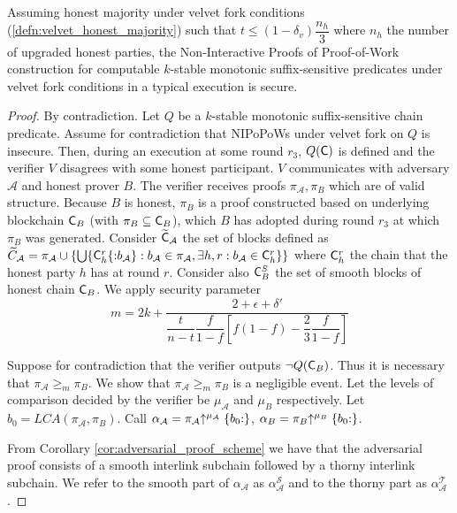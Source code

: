 \begin{theorem}
	Assuming honest majority under velvet fork conditions (\ref{defn:velvet_honest_majority}) such that $t \leq (1 - \delta_v) \dfrac{n_h}{3}$ where $n_h$ the number of upgraded honest parties, the Non-Interactive Proofs of Proof-of-Work construction for computable $k$-stable monotonic suffix-sensitive predicates under velvet fork conditions in a typical execution is secure.
\end{theorem}
\begin{proof}
By contradiction. Let $Q$ be a $k$-stable monotonic suffix-sensitive chain predicate. Assume for contradiction that NIPoPoWs under velvet fork on $Q$ is insecure. Then, during an execution at some round  $r_3$, $Q(\mathsf{C})$ is defined and the verifier $V$ disagrees with some honest participant. $V$ communicates with adversary $\mathcal{A}$ and honest prover $B$. The verifier receives proofs $\pi_\mathcal{A}, \pi_B$ which are of valid structure. Because $B$ is honest, $\pi_B$ is a proof constructed based on underlying blockchain $\mathsf{C}_B$ (with $\pi_B \subseteq \mathsf{C}_B$), which $B$ has adopted during round $r_3$ at which $\pi_B$ was generated. Consider $\widetilde{\mathsf{C}}_\mathcal{A}$ the set of blocks defined as $\widetilde{C}_\mathcal{A} = \pi_\mathcal{A} \cup \{ \bigcup \{\mathsf{C}_h^r\{{:}b_\mathcal{A}\}:  b_\mathcal{A} \in \pi_\mathcal{A}, \exists h,r : b_\mathcal{A} \in \mathsf{C}_{h}^{r}\}  \}$ where $\mathsf{C}_h^r$ the chain that the honest party $h$ has at round $r$. Consider also $\mathsf{C}^S_B$ the set of smooth blocks of honest chain $\mathsf{C}_B$. We apply security parameter
\begin{equation*}
    m = 2k + \dfrac{2+\epsilon + \delta'}{\dfrac{t}{n-t}\dfrac{f}{1-f}[f(1-f) - \dfrac{2}{3}\dfrac{f}{1-f}]}
\end{equation*}

Suppose for contradiction that the verifier outputs $\neg Q(\mathsf{C}_B)$. Thus it is necessary that $\pi_\mathcal{A} {\geq}_m \pi_B$. We show that $\pi_\mathcal{A} {\geq}_m \pi_B$ is a negligible event.
Let the levels of comparison decided by the verifier be $\mu_\mathcal{A}$ and $\mu_B$ respectively. Let $b_0 = LCA(\pi_\mathcal{A}, \pi_B)$. Call $\alpha_\mathcal{A} = \pi_\mathcal{A} \negthickspace\uparrow^{\mu_\mathcal{A}}\{b_0{:}\}$, $\alpha_B = \pi_B \negthickspace\uparrow^{\mu_B}\{b_0{:}\}$.

From Corollary \ref{cor:adversarial_proof_scheme} we have that the adversarial proof consists of a smooth interlink subchain followed by a thorny interlink subchain. We refer to the smooth part of $\alpha_\mathcal{A}$ as $\alpha^{\mathcal{S}}_\mathcal{A}$ and to the thorny part as $\alpha^{\mathcal{T}}_\mathcal{A}$.


\end{proof}
